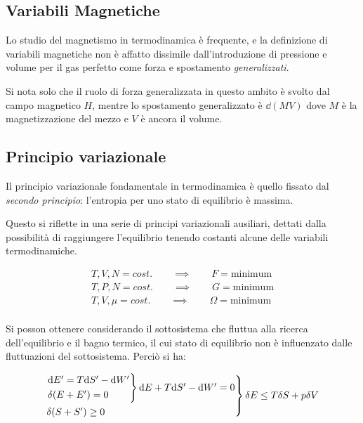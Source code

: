 \subsection{Variabili Magnetiche}
Lo studio del magnetismo in termodinamica è frequente, e la definizione di variabili magnetiche non è affatto dissimile dall'introduzione di pressione e volume per il gas perfetto come forza e spostamento \textit{generalizzati}.

Si nota solo che il ruolo di forza generalizzata in questo ambito è svolto dal campo magnetico $ H $, mentre lo spostamento generalizzato è $ \dd (M V) $ dove $M$ è la magnetizzazione del mezzo e $V$ è ancora il volume.

\subsection{Principio variazionale}
Il principio variazionale fondamentale in termodinamica è quello fissato dal \textit{secondo principio}: l'entropia per uno stato di equilibrio è massima.

Questo si riflette in una serie di principi variazionali ausiliari, dettati dalla possibilità di raggiungere l'equilibrio tenendo costanti alcune delle variabili termodinamiche.

\begin{align*}
	T, V, N = cost. \qquad \implies \qquad F = \text{minimum}\\
	T, P, N = cost. \qquad \implies \qquad G = \text{minimum}\\
	T, V, \mu = cost. \qquad \implies \qquad \Omega = \text{minimum}\\
\end{align*}

Si posson ottenere considerando il sottosistema che fluttua alla ricerca dell'equilibrio e il bagno termico, il cui stato di equilibrio non è influenzato dalle fluttuazioni del sottosistema. Perciò si ha:

\begin{equation*}
\begin{rcases*}
\begin{rcases*}
\dd E' = T \dd S' - \dd W'\\
\delta (E + E') = 0
\end{rcases*} \dd E + T \dd S' - \dd W' = 0\\
\delta (S + S') \geq 0
\end{rcases*}
\delta E \leq T \delta S + p \delta V
\end{equation*}

